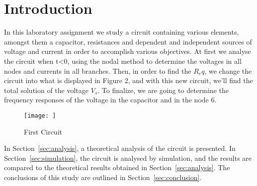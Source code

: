 \newpage
\section{Introduction}
\label{sec:introduction}

In this laboratory assignment we study a circuit containing various elements, amongst them a capacitor, resistances and dependent and independent sources of voltage and current in order to accomplish various objectives. At first we analyse the circuit when t<0, using the nodal method to determine the voltages in all nodes and currents in all branches. Then, in order to find the $R_eq$, we change the circuit into what is displayed in Figure 2, and with this new circuit, we'll find the total solution of the voltage $V_s$. To finalize, we are going to determine the frequency responses of the voltage in the capacitor and in the node 6. 

\begin{figure}[h] \centering
\texttt{[image: ]}
\caption{First Circuit}
\label{fig:rc}
\end{figure}


In Section~\ref{sec:analysis}, a theoretical analysis of the circuit is
presented. In Section~\ref{sec:simulation}, the circuit is analysed by
simulation, and the results are compared to the theoretical results obtained in
Section~\ref{sec:analysis}. The conclusions of this study are outlined in
Section~\ref{sec:conclusion}. \\

\pagebreak
